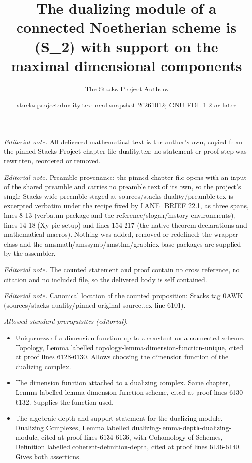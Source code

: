 \documentclass[10pt,a4paper]{amsart}
\title{The dualizing module of a connected Noetherian scheme is (S\_2) with support on the maximal dimensional components}
\author{The Stacks Project Authors}
\date{stacks-project:duality.tex:local-snapshot-20261012; GNU FDL 1.2 or later}
\theoremstyle{plain}
\theoremstyle{definition}
\theoremstyle{remark}
\numberwithin{equation}{subsection}
\begin{document}
\maketitle
\noindent\textit{Editorial note.} All delivered mathematical text is the author's own, copied from the pinned Stacks Project chapter file duality.tex; no statement or proof step was rewritten, reordered or removed.\par\medskip
\noindent\textit{Editorial note.} Preamble provenance: the pinned chapter file opens with an input of the shared preamble and carries no preamble text of its own, so the project's single Stacks-wide preamble staged at sources/stacks-duality/preamble.tex is excerpted verbatim under the recipe fixed by LANE\_BRIEF 22.1, as three spans, lines 8-13 (verbatim package and the reference/slogan/history environments), lines 14-18 (Xy-pic setup) and lines 154-217 (the native theorem declarations and mathematical macros). Nothing was added, removed or redefined; the wrapper class and the amsmath/amssymb/amsthm/graphicx base packages are supplied by the assembler.\par\medskip
\noindent\textit{Editorial note.} The counted statement and proof contain no cross reference, no citation and no included file, so the delivered body is self contained.\par\medskip
\noindent\textit{Editorial note.} Canonical location of the counted proposition: Stacks tag 0AWK (sources/stacks-duality/pinned-original-source.tex line 6101).\par\medskip
\noindent\textit{Allowed standard prerequisites (editorial).}\begin{itemize}
\item Uniqueness of a dimension function up to a constant on a connected scheme. Topology, Lemma labelled topology-lemma-dimension-function-unique, cited at proof lines 6128-6130. Allows choosing the dimension function of the dualizing complex.
\item The dimension function attached to a dualizing complex. Same chapter, Lemma labelled lemma-dimension-function-scheme, cited at proof lines 6130-6132. Supplies the function used.
\item The algebraic depth and support statement for the dualizing module. Dualizing Complexes, Lemma labelled dualizing-lemma-depth-dualizing-module, cited at proof lines 6134-6136, with Cohomology of Schemes, Definition labelled coherent-definition-depth, cited at proof lines 6136-6140. Gives both assertions.
\end{itemize}\medskip
\end{document}
